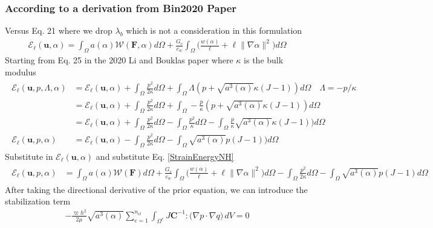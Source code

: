 \documentclass[12pt,3p]{article}
\numberwithin{equation}{section}
\begin{document}
\subsubsection{According to a derivation from Bin2020 Paper}
Versus Eq. 21 where we drop $\lambda_b$ which is not a consideration in this formulation
\begin{align}
\mathcal{E}_{\ell}(\boldsymbol{u}, \alpha) =\int_{\Omega} a(\alpha) \mathcal{W}(\mathbf{F}, \alpha) d \Omega+\frac{G_{c}}{c_{w}} \int_{\Omega} \bigg(\frac{w(\alpha)}{\ell}+\ell\|\nabla \alpha\|^{2} \bigg) d \Omega 
\end{align}
Starting from Eq. 25 in the 2020 Li and Bouklas paper where $\kappa$ is the bulk modulus 
\begin{align}
\begin{split}
\mathcal{E}_{\ell}\left(\boldsymbol{u}, p, \Lambda, \alpha\right) &= \mathcal{E}_{\ell} (\boldsymbol{u}, \alpha ) + \int_{\Omega} \frac{p^{2}}{2 \kappa} d \Omega +\int_{\Omega} \Lambda(p+\sqrt{a^{3}(\alpha)} \kappa (J-1)) d \Omega \quad \Lambda = -p/\kappa \\
		&= \mathcal{E}_{\ell} (\boldsymbol{u}, \alpha ) + \int_{\Omega} \frac{p^{2}}{2 \kappa} d \Omega +\int_{\Omega} - \frac{p}{\kappa} (p+\sqrt{a^{3}(\alpha)} \kappa (J-1)) d \Omega \\
		&= \mathcal{E}_{\ell} (\boldsymbol{u}, \alpha ) + \int_{\Omega} \frac{p^{2}}{2 \kappa} d \Omega -\int_{\Omega} \frac{p^2}{\kappa} d \Omega - \int_{\Omega} \frac{p}{\kappa} \sqrt{a^{3}(\alpha)} \kappa (J-1)) d \Omega \\
\mathcal{E}_{\ell}\left(\boldsymbol{u}, p, \alpha\right) &= \mathcal{E}_{\ell} (\boldsymbol{u}, \alpha ) - \int_{\Omega} \frac{p^{2}}{2 \kappa} d \Omega - \int_{\Omega} \sqrt{a^{3}(\alpha)} p(J-1)) d \Omega
\end{split}
\end{align}
Substitute in $\mathcal{E}_{\ell} (\boldsymbol{u}, \alpha )$ and substitute Eq. \ref{StrainEnergyNH}
\begin{align*}
\begin{split}
\mathcal{E}_{\ell}\left(\boldsymbol{u}, p, \alpha\right) &= \int_{\Omega} a(\alpha) \mathcal{W}(\mathbf{F}) d \Omega+\frac{G_{c}}{c_{w}} \int_{\Omega} \bigg(\frac{w(\alpha)}{\ell}+\ell\|\nabla \alpha\|^{2} \bigg) d \Omega- \int_{\Omega} \frac{p^{2}}{2 \kappa} d \Omega - \int_{\Omega} \sqrt{a^{3}(\alpha)} p(J-1) d \Omega 
\end{split}
\end{align*}
After taking the directional derivative of the prior equation, we can introduce the stabilization term 
\begin{align*}
- \frac{\varpi h^2}{2\mu} \sqrt{a^3(\alpha)} \sum_{e=1}^{n_{el}}\int_{\Omega^{e}} J \mathbf{C}^{-1} : \big( \nabla p \cdot \nabla q \big) \,dV = 0 
\end{align*}
\end{document}
